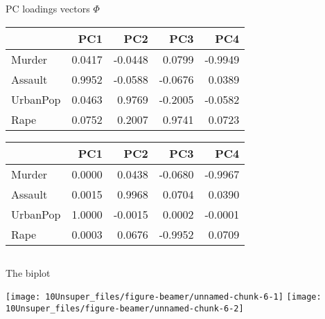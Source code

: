 \documentclass[
  10pt,
  ignorenonframetext,
]{beamer}
\begin{document}
\begin{frame}
\begin{block}{PC loadings vectors \(\Phi\)}
\protect\hypertarget{pc-loadings-vectors-phi}{}
\(~\)

\begin{table}

\centering
\begin{tabular}[t]{l|r|r|r|r}
\hline
  & PC1 & PC2 & PC3 & PC4\\
\hline
Murder & 0.0417 & -0.0448 & 0.0799 & -0.9949\\
\hline
Assault & 0.9952 & -0.0588 & -0.0676 & 0.0389\\
\hline
UrbanPop & 0.0463 & 0.9769 & -0.2005 & -0.0582\\
\hline
Rape & 0.0752 & 0.2007 & 0.9741 & 0.0723\\
\hline
\end{tabular}
\centering
\begin{tabular}[t]{l|r|r|r|r}
\hline
  & PC1 & PC2 & PC3 & PC4\\
\hline
Murder & 0.0000 & 0.0438 & -0.0680 & -0.9967\\
\hline
Assault & 0.0015 & 0.9968 & 0.0704 & 0.0390\\
\hline
UrbanPop & 1.0000 & -0.0015 & 0.0002 & -0.0001\\
\hline
Rape & 0.0003 & 0.0676 & -0.9952 & 0.0709\\
\hline
\end{tabular}
\end{table}

\(~\)
\end{block}
\end{frame}

\begin{frame}
\begin{block}{The biplot}
\protect\hypertarget{the-biplot}{}
\(~\)

\centering

\texttt{[image: 10Unsuper\_files/figure-beamer/unnamed-chunk-6-1]}
\texttt{[image: 10Unsuper\_files/figure-beamer/unnamed-chunk-6-2]}
\end{block}
\end{frame}
\end{document}
